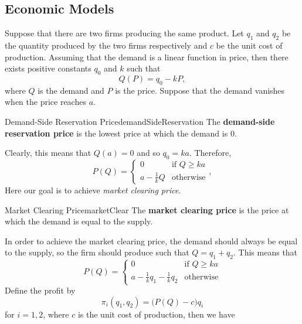 \documentclass[math]{amznotes}
\theoremstyle{remark}
\begin{document}
\subsection{Economic Models}
Suppose that there are two firms producing the same product. Let $q_1$ and $q_2$ be the quantity produced by the two firms respectively and $c$ be the unit cost of production. Assuming that the demand is a linear function in price, then there exists positive constants $q_0$ and $k$ such that 
\begin{equation*}
    Q\left(P\right) = q_0 - kP,
\end{equation*}
where $Q$ is the demand and $P$ is the price. Suppose that the demand vanishes when the price reaches $a$. 
\begin{dfnbox}{Demand-Side Reservation Price}{demandSideReservation}
    The {\color{red} \textbf{demand-side reservation price}} is the lowest price at which the demand is $0$.
\end{dfnbox}
Clearly, this means that $Q\left(a\right) = 0$ and so $q_0 = ka$. Therefore, 
\begin{equation*}
    P\left(Q\right) = \begin{cases}
        0 & \textrm{if } Q \geq ka \\
        a - \frac{1}{k}Q & \textrm{otherwise}
    \end{cases},
\end{equation*}
Here our goal is to achieve \textit{market clearing price}.
\begin{dfnbox}{Market Clearing Price}{marketClear}
    The {\color{red} \textbf{market clearing price}} is the price at which the demand is equal to the supply.
\end{dfnbox}
In order to achieve the market clearing price, the demand should always be equal to the supply, so the firm should produce such that $Q = q_1 + q_2$. This means that 
\begin{equation*}
    P\left(Q\right) = \begin{cases}
        0 & \textrm{if } Q \geq ka \\
        a - \frac{1}{k}q_1 - \frac{1}{k}q_2 & \textrm{otherwise}
    \end{cases}
\end{equation*}
Define the profit by 
\begin{equation*}
    \pi_i\left(q_1, q_2\right) = \bigl(P\left(Q\right) - c\bigr)q_i
\end{equation*}
for $i = 1, 2$, where $c$ is the unit cost of production, then we have 
\end{document}
